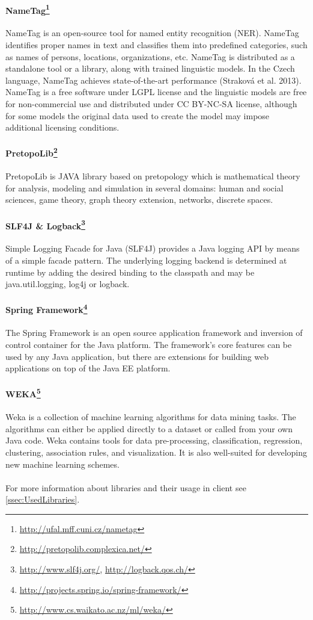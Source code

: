 \paragraph{NameTag\footnote{\url{http://ufal.mff.cuni.cz/nametag}}}
NameTag is an open-source tool for named entity recognition (NER). NameTag 
identifies proper names in text and classifies them into predefined categories,
such as names of persons, locations, organizations, etc. NameTag is distributed
as a standalone tool or a library, along with trained linguistic models.
In the Czech language, NameTag achieves state-of-the-art performance
(Straková et al. 2013). NameTag is a free software under LGPL license and the 
linguistic models are free for non-commercial use and distributed under CC 
BY-NC-SA license, although for some models the original data used to create
the model may impose additional licensing conditions.

\paragraph{PretopoLib\footnote{\url{http://pretopolib.complexica.net/}}}
PretopoLib is JAVA library based on pretopology which is mathematical theory for
analysis, modeling and simulation in several domains: human and social sciences,
game theory, graph theory extension, networks, discrete spaces.

\paragraph{SLF4J \& Logback\footnote{\url{http://www.slf4j.org/}, \url{http://logback.qos.ch/}}}
Simple Logging Facade for Java (SLF4J) provides a Java logging API by means
of a simple facade pattern. The underlying logging backend is determined
at runtime by adding the desired binding to the classpath and may be
java.util.logging, log4j or logback.

\paragraph{Spring Framework\footnote{\url{http://projects.spring.io/spring-framework/}}}
The Spring Framework is an open source application framework and inversion
of control container for the Java platform. The framework's core features
can be used by any Java application, but there are extensions for building
web applications on top of the Java EE platform.

\paragraph{WEKA\footnote{\url{http://www.cs.waikato.ac.nz/ml/weka/}}}
Weka is a collection of machine learning algorithms for data mining tasks.
The algorithms can either be applied directly to a dataset or called from your
own Java code. Weka contains tools for data pre-processing, classification,
regression, clustering, association rules, and visualization. It is also
well-suited for developing new machine learning schemes.

\paragraph{} For more information about libraries and their usage in client see
\ref{ssec:UsedLibraries}.